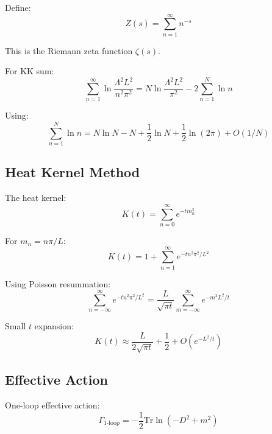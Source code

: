 \documentclass[11pt,a4paper]{article}
\begin{document}
Define:
\begin{equation}
\label{eq:kk-zeta-def}
Z(s) = \sum_{n=1}^{\infty} n^{-s}
\end{equation}

This is the Riemann zeta function $\zeta(s)$.

For KK sum:
\begin{equation}
\label{eq:kk-zeta-sum}
\sum_{n=1}^{\infty} \ln\frac{\Lambda^2 L^2}{n^2\pi^2} = N \ln\frac{\Lambda^2 L^2}{\pi^2} - 2\sum_{n=1}^{N}\ln n
\end{equation}

Using:
\begin{equation}
\label{eq:stirling}
\sum_{n=1}^{N}\ln n = N\ln N - N + \frac{1}{2}\ln N + \frac{1}{2}\ln(2\pi) + O(1/N)
\end{equation}

\subsection{Heat Kernel Method}
\label{app:heat-kernel}

The heat kernel:
\begin{equation}
\label{eq:heat-kernel-def}
K(t) = \sum_{n=0}^{\infty} e^{-t m_n^2}
\end{equation}

For $m_n = n\pi/L$:
\begin{equation}
\label{eq:heat-kernel-kk}
K(t) = 1 + \sum_{n=1}^{\infty} e^{-t n^2 \pi^2/L^2}
\end{equation}

Using Poisson resummation:
\begin{equation}
\label{eq:poisson}
\sum_{n=-\infty}^{\infty} e^{-t n^2 \pi^2/L^2} = \frac{L}{\sqrt{\pi t}} \sum_{m=-\infty}^{\infty} e^{-m^2 L^2/t}
\end{equation}

Small $t$ expansion:
\begin{equation}
\label{eq:heat-small-t}
K(t) \approx \frac{L}{2\sqrt{\pi t}} + \frac{1}{2} + O(e^{-L^2/t})
\end{equation}

\subsection{Effective Action}
\label{app:eff-action}

One-loop effective action:
\begin{equation}
\label{eq:eff-action}
\Gamma_{\text{1-loop}} = -\frac{1}{2}\text{Tr}\ln(-D^2 + m^2)
\end{equation}
\end{document}
